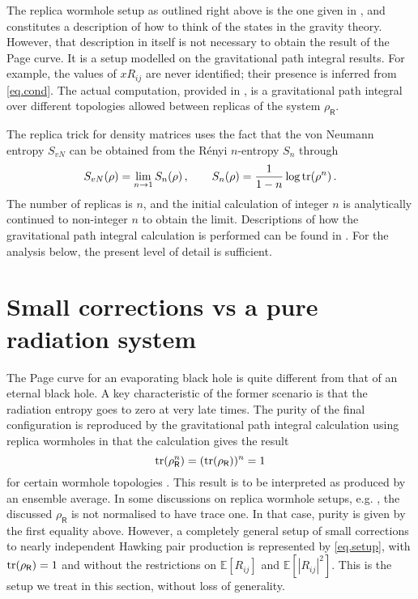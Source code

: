 \documentclass[12pt]{article}
\def\be{\begin{equation}}
\def\ee{\end{equation}}
\numberwithin{equation}{section}
\begin{document}
The replica wormhole setup as outlined right above is the one given in \cite{Penington:2019kki}, and constitutes a description of how to think of the states in the gravity theory. However, that description in itself is not necessary to obtain the result of the Page curve. It is a setup modelled on the gravitational path integral results. For example, the values of $xR_{ij}$ are never identified; their presence is inferred from \eqref{eq.cond}. The actual computation, provided in \cite{Penington:2019kki,Almheiri:2019qdq}, is a gravitational path integral over different topologies allowed between replicas of the system $\rho_\textsf{R}$.

The replica trick for density matrices uses the fact that the von Neumann entropy $S_{vN}$ can be obtained from the R\'enyi $n$-entropy $S_n$ through
\be
S_{vN}(\rho)=\lim_{n\rightarrow1}S_n(\rho)\,,\qquad S_n(\rho)=\frac{1}{1-n}\log {\rm tr}(\rho^n)\,.
\ee
The number of replicas is $n$, and the initial calculation of integer $n$ is analytically continued to non-integer $n$ to obtain the limit. Descriptions of how the gravitational path integral calculation is performed can be found in \cite{Penington:2019kki,Almheiri:2019qdq}. For the analysis below, the present level of detail is sufficient.

\section{Small corrections vs a pure radiation system}\label{s.small}
The Page curve for an evaporating black hole is quite different from that of an eternal black hole. A key characteristic of the former scenario is that the radiation entropy goes to zero at very late times. The purity of the final configuration is reproduced by the gravitational path integral calculation using replica wormholes in that the calculation gives the result
\be
{\rm tr}(\rho^n_\textsf{R})=({\rm tr}(\rho_\textsf{R}))^n=1
\ee
for certain wormhole topologies \cite{Penington:2019kki,Almheiri:2019qdq}. This result is to be interpreted as produced by an ensemble average. In some discussions on replica wormhole setups, e.g. \cite{Almheiri:2020cfm,Marolf:2020rpm}, the discussed $\rho_\textsf{R}$ is not normalised to have trace one. In that case, purity is given by the first equality above. However, a completely general setup of small corrections to nearly independent Hawking pair production is represented by \eqref{eq.setup}, with ${\rm tr}(\rho_\textsf{R})=1$ and without the restrictions on $\mathbb{E}\left[R_{ij}\right]$ and $\mathbb{E}\left[|R_{ij}|^2\right]$. This is the setup we treat in this section, without loss of generality.
\end{document}
